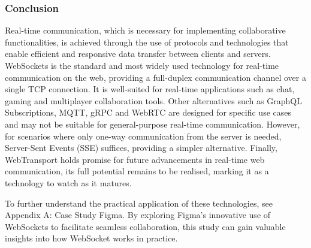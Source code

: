 \subsubsection{Conclusion}

Real-time communication, which is necessary for implementing collaborative functionalities, is achieved through the use of protocols and technologies that enable efficient and responsive data transfer between clients and servers. WebSockets is the standard and most widely used technology for real-time communication on the web, providing a full-duplex communication channel over a single TCP connection. It is well-suited for real-time applications such as chat, gaming and multiplayer collaboration tools. Other alternatives such as GraphQL Subscriptions, MQTT, gRPC and WebRTC are designed for specific use cases and may not be suitable for general-purpose real-time communication. However, for scenarios where only one-way communication from the server is needed, Server-Sent Events (SSE) suffices, providing a simpler alternative. Finally, WebTransport holds promise for future advancements in real-time web communication, its full potential remains to be realised, marking it as a technology to watch as it matures.

To further understand the practical application of these technologies, see Appendix A: Case Study Figma. By exploring Figma's innovative use of WebSockets to facilitate seamless collaboration, this study can gain valuable insights into how WebSocket works in practice.
